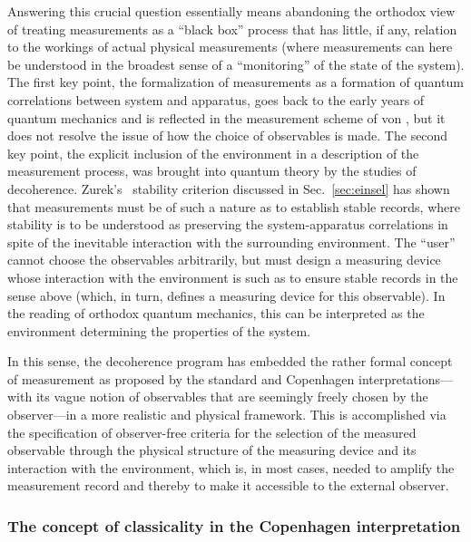 \documentclass[rmp,aps,amsmath,amsfonts,noshowkeys,noshowpacs,12pt]{revtex4}
\begin{document}
Answering this crucial question essentially means abandoning the
orthodox view of treating measurements as a ``black box'' process that
has little, if any, relation to the workings of actual physical
measurements (where measurements can here be understood in the
broadest sense of a ``monitoring'' of the state of the system).  The
first key point, the formalization of measurements as a formation of
quantum correlations between system and apparatus, goes back to the
early years of quantum mechanics and is reflected in the measurement
scheme of von \citet{Neumann:1932:gq}, but it does not resolve the
issue of how the choice of observables is made. The second key point,
the explicit inclusion of the environment in a description of the
measurement process, was brought into quantum theory by the studies of
decoherence. Zurek's~\citeyearpar{Zurek:1981:dd} stability criterion
discussed in Sec.~\ref{sec:einsel} has shown that measurements must be
of such a nature as to establish stable records, where stability is to
be understood as preserving the system-apparatus correlations in spite
of the inevitable interaction with the surrounding environment.  The
``user'' cannot choose the observables arbitrarily, but must design a
measuring device whose interaction with the environment is such as to
ensure stable records in the sense above (which, in turn, defines a
measuring device for this observable). In the reading of orthodox
quantum mechanics, this can be interpreted as the environment
determining the properties of the system.

In this sense, the decoherence program has embedded the rather formal
concept of measurement as proposed by the standard and Copenhagen
interpretations---with its vague notion of observables that are
seemingly freely chosen by the observer---in a more realistic and
physical framework. This is accomplished via the specification of
observer-free criteria for the selection of the measured observable
through the physical structure of the measuring device and its
interaction with the environment, which is, in most cases, needed to
amplify the measurement record and thereby to make it accessible to
the external observer.


\subsubsection{The concept of classicality in the Copenhagen interpretation}
\end{document}
